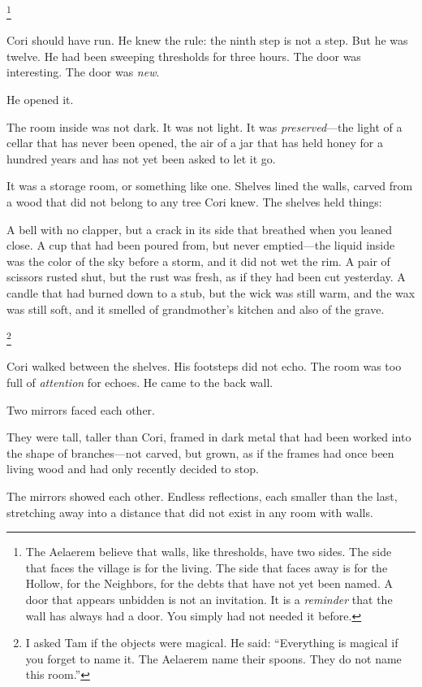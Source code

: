 \documentclass[12pt]{article}
\begin{document}
\footnote{The Aelaerem believe that walls, like thresholds, have two sides. The side that faces the village is for the living. The side that faces away is for the Hollow, for the Neighbors, for the debts that have not yet been named. A door that appears unbidden is not an invitation. It is a \textit{reminder} that the wall has always had a door. You simply had not needed it before.}

Cori should have run. He knew the rule: the ninth step is not a step. But he was twelve. He had been sweeping thresholds for three hours. The door was interesting. The door was \textit{new}.

He opened it.

The room inside was not dark. It was not light. It was \textit{preserved}---the light of a cellar that has never been opened, the air of a jar that has held honey for a hundred years and has not yet been asked to let it go.

It was a storage room, or something like one. Shelves lined the walls, carved from a wood that did not belong to any tree Cori knew. The shelves held things:

A bell with no clapper, but a crack in its side that breathed when you leaned close.
A cup that had been poured from, but never emptied---the liquid inside was the color of the sky before a storm, and it did not wet the rim.
A pair of scissors rusted shut, but the rust was fresh, as if they had been cut yesterday.
A candle that had burned down to a stub, but the wick was still warm, and the wax was still soft, and it smelled of grandmother's kitchen and also of the grave.

\footnote{I asked Tam if the objects were magical. He said: ``Everything is magical if you forget to name it. The Aelaerem name their spoons. They do not name this room.''}

Cori walked between the shelves. His footsteps did not echo. The room was too full of \textit{attention} for echoes. He came to the back wall.

Two mirrors faced each other.

They were tall, taller than Cori, framed in dark metal that had been worked into the shape of branches---not carved, but grown, as if the frames had once been living wood and had only recently decided to stop.

The mirrors showed each other. Endless reflections, each smaller than the last, stretching away into a distance that did not exist in any room with walls.
\end{document}

